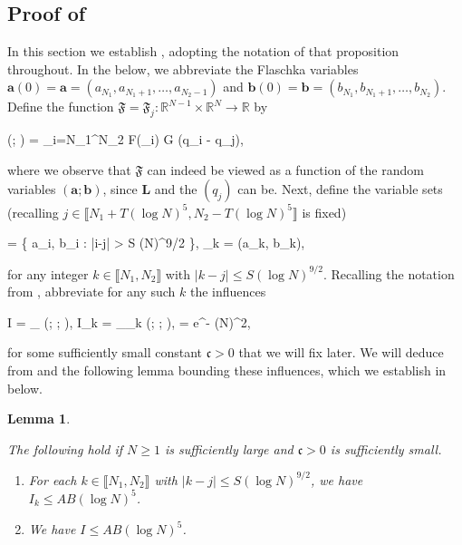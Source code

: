 \documentclass{amsart}
\numberwithin{equation}{section}
\DeclareMathOperator{\Infl}{Infl}
\newtheorem{lem}[thm]{Lemma}
\theoremstyle{remark}
\theoremstyle{definition}
\begin{document}
	
	

	\subsection{Proof of } 
	
	\label{ProofH2} 
	
	In this section we establish , adopting the notation of that proposition throughout. In the below, we abbreviate the Flaschka variables $\bm{a}(0) = \bm{a} = (a_{N_1}, a_{N_1+1}, \ldots , a_{N_2-1})$ and $\bm{b}(0) = \bm{b} = (b_{N_1}, b_{N_1+1}, \ldots , b_{N_2})$. Define the function $\mathfrak{F} = \mathfrak{F}_j: \mathbb{R}^{N-1} \times \mathbb{R}^N \rightarrow \mathbb{R}$ by  
		\begin{flalign}
			\label{f} 
			  (; ) = \displaystyle\sum_{i=N_1}^{N_2} F(\Lambda_i) \cdot G (q_i - q_j),
		\end{flalign} 
		
		\noindent where we observe that $\mathfrak{F}$ can indeed be viewed as a function of the random variables $(\bm{a}; \bm{b})$, since $\bm{L}$ and the $(q_j)$ can be. Next, define the variable sets (recalling $j \in \llbracket N_1 + T(\log N)^5, N_2 - T(\log N)^5 \rrbracket$ is fixed)
		\begin{flalign*}
			 = \{ a_i, b_i : |i-j| > S (\log N)^{9/2} \}, \qquad {} \qquad {}_k = (a_k, b_k),
		\end{flalign*} 
		
		\noindent  for any integer $k \in \llbracket N_1, N_2 \rrbracket$ with $|k-j| \le S (\log N)^{9/2}$. Recalling the notation from , abbreviate for any such $k$ the influences 
		\begin{flalign*} 
			I = \Infl_{} (; ;  \cup {}), \qquad {} \qquad I_k = \Infl_{_k} (; ;  \cup {}), \qquad {} \quad {} = e^{- (\log N)^2},
		\end{flalign*} 
	
		\noindent for some sufficiently small constant $\mathfrak{c} > 0$ that we will fix later. We will deduce  from  and the following lemma bounding these influences, which we establish in  below. 
		
		\begin{lem} 
			
		\label{estimateik} 
		
		The following hold if $N \ge 1$ is sufficiently large and $\mathfrak{c} > 0$ is sufficiently small. 
		
		\begin{enumerate} 
			\item For each $k \in \llbracket N_1, N_2 \rrbracket$ with $|k-j| \le S (\log N)^{9/2}$, we have $I_k \le AB(\log N)^5$.
			\item We have $I \le AB(\log N)^5$.
		\end{enumerate} 
		
		\end{lem} 
		
\end{document}
